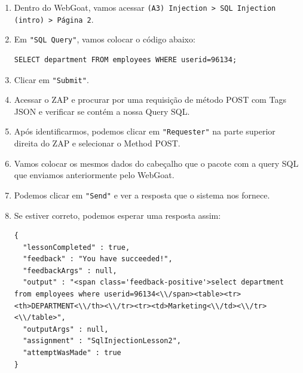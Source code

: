 \documentclass[11pt]{ifscarticle}
\begin{document}
\begin{enumerate}
    \item Dentro do WebGoat, vamos acessar \texttt{(A3) Injection > SQL Injection (intro) > Página 2}.
    \item Em \texttt{"SQL Query"}, vamos colocar o código abaixo:
\begin{lstlisting}[style=sql]
SELECT department FROM employees WHERE userid=96134;
\end{lstlisting}
    \item Clicar em \texttt{"Submit"}.
    \item Acessar o ZAP e procurar por uma requisição de método POST com Tags JSON e verificar se contém a nossa Query SQL.
    \item Após identificarmos, podemos clicar em \texttt{"Requester"} na parte superior direita do ZAP e selecionar o Method POST.
    \item Vamos colocar os mesmos dados do cabeçalho que o pacote com a query SQL que enviamos anteriormente pelo WebGoat.
    \item Podemos clicar em \texttt{"Send"} e ver a resposta que o sistema nos fornece.
    \item Se estiver correto, podemos esperar uma resposta assim:
\begin{lstlisting}[style=json]
{
  "lessonCompleted" : true,
  "feedback" : "You have succeeded!",
  "feedbackArgs" : null,
  "output" : "<span class='feedback-positive'>select department from employees where userid=96134<\\/span><table><tr><th>DEPARTMENT<\\/th><\\/tr><tr><td>Marketing<\\/td><\\/tr><\\/table>",
  "outputArgs" : null,
  "assignment" : "SqlInjectionLesson2",
  "attemptWasMade" : true
}
\end{lstlisting}
\end{enumerate}
\end{document}

